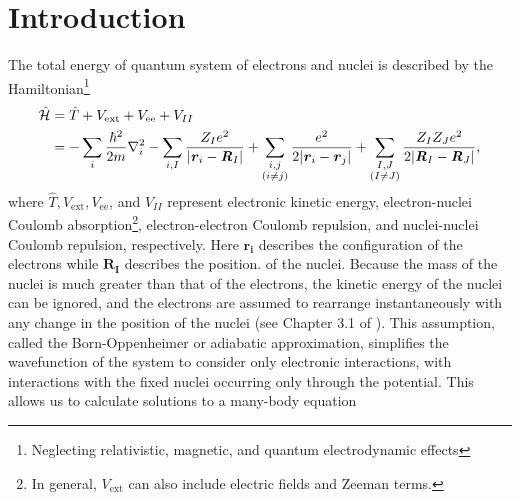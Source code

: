 \section{Introduction}
The total energy of quantum system of electrons and nuclei is described by the
Hamiltonian\footnote{Neglecting relativistic, magnetic, and quantum
electrodynamic effects}
%
%
\begin{equation}\label{generalhee}
\begin{aligned}
\mathcal{\hat H}&=\hat{T}+V_\text{ext}+V_\text{ee}+V_{II} \\
&=-\sum_i\frac{\hbar^2}{2m}\nabla_i^2-
\sum_{i,I}\frac{Z_Ie^2}{|\textbf{\textit r}_i-\textbf{\textit R}_I|}+
\sum_{\substack{i,j\\(i\neq j)}}\frac{e^2}{2|\textbf{\textit r}_i-\textbf{\textit r}_j|}+
\sum_{\substack{I,J\\(I\neq J)}}\frac{Z_IZ_Je^2}{2|\textbf{\textit R}_I-\textbf{\textit R}_J|},
\end{aligned}
\end{equation}
%
where $\hat{T}, V_\text{ext}, V_\text{ee}$, and $V_{II}$ represent electronic kinetic
energy, electron-nuclei Coulomb absorption\footnote{In general, $V_\text{ext}$ can
also include electric fields and Zeeman terms.}, electron-electron Coulomb repulsion,
and nuclei-nuclei Coulomb repulsion, respectively.  Here $\mathbf{r_i}$ describes the
configuration of the electrons while $\mathbf{R_I}$ describes the position.  of the
nuclei.  Because the mass of the nuclei is much greater than that of the electrons,
the kinetic energy of the nuclei can be ignored, and the electrons are assumed to
rearrange instantaneously with any change in the position of the nuclei (see Chapter
3.1 of \cite{martin-esbook}). This assumption, called the Born-Oppenheimer or
adiabatic approximation, simplifies the wavefunction of the system to consider only
electronic interactions, with interactions with the fixed nuclei occurring only
through the potential. This allows us to calculate solutions to a many-body equation
